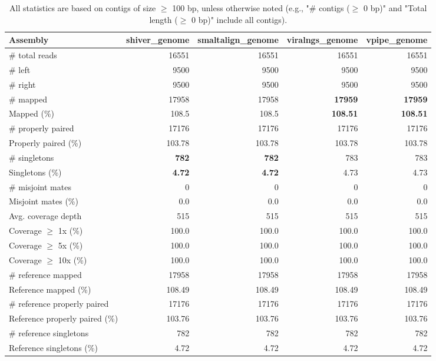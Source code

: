 \documentclass[12pt,a4paper]{article}
\begin{document}
\begin{table}[ht]
\begin{center}
\caption{All statistics are based on contigs of size $\geq$ 100 bp, unless otherwise noted (e.g., "\# contigs ($\geq$ 0 bp)" and "Total length ($\geq$ 0 bp)" include all contigs).}
\begin{tabular}{|l*{4}{|r}|}
\hline
Assembly & shiver\_genome & smaltalign\_genome & viralngs\_genome & vpipe\_genome \\ \hline
\# total reads & 16551 & 16551 & 16551 & 16551 \\ \hline
\# left & 9500 & 9500 & 9500 & 9500 \\ \hline
\# right & 9500 & 9500 & 9500 & 9500 \\ \hline
\# mapped & 17958 & 17958 & {\bf 17959} & {\bf 17959} \\ \hline
Mapped (\%) & 108.5 & 108.5 & {\bf 108.51} & {\bf 108.51} \\ \hline
\# properly paired & 17176 & 17176 & 17176 & 17176 \\ \hline
Properly paired (\%) & 103.78 & 103.78 & 103.78 & 103.78 \\ \hline
\# singletons & {\bf 782} & {\bf 782} & 783 & 783 \\ \hline
Singletons (\%) & {\bf 4.72} & {\bf 4.72} & 4.73 & 4.73 \\ \hline
\# misjoint mates & 0 & 0 & 0 & 0 \\ \hline
Misjoint mates (\%) & 0.0 & 0.0 & 0.0 & 0.0 \\ \hline
Avg. coverage depth & 515 & 515 & 515 & 515 \\ \hline
Coverage $\geq$ 1x (\%) & 100.0 & 100.0 & 100.0 & 100.0 \\ \hline
Coverage $\geq$ 5x (\%) & 100.0 & 100.0 & 100.0 & 100.0 \\ \hline
Coverage $\geq$ 10x (\%) & 100.0 & 100.0 & 100.0 & 100.0 \\ \hline
\# reference mapped & 17958 & 17958 & 17958 & 17958 \\ \hline
Reference mapped (\%) & 108.49 & 108.49 & 108.49 & 108.49 \\ \hline
\# reference properly paired & 17176 & 17176 & 17176 & 17176 \\ \hline
Reference properly paired (\%) & 103.76 & 103.76 & 103.76 & 103.76 \\ \hline
\# reference singletons & 782 & 782 & 782 & 782 \\ \hline
Reference singletons (\%) & 4.72 & 4.72 & 4.72 & 4.72 \\ \hline

\end{tabular}
\end{center}
\end{table}
\end{document}
